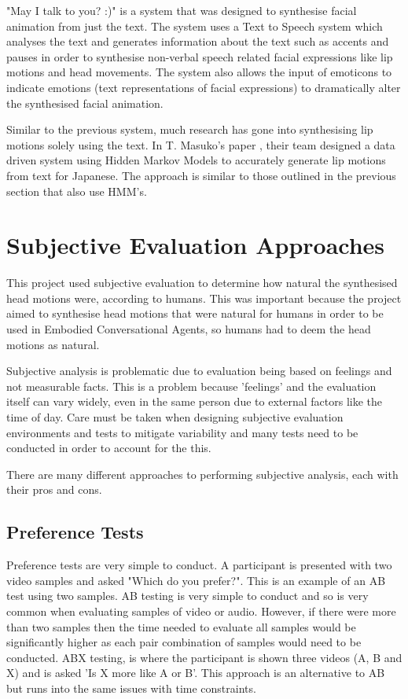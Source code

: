 \documentclass[bsc,frontabs,twoside,singlespacing,parskip]{infthesis}
\begin{document}
"May I talk to you? :)"  \cite{may_i_talk_to_you} is a system that was designed to synthesise facial animation from just the text. The system uses a Text to Speech system which analyses the text and generates information about the text such as accents and pauses in order to synthesise non-verbal speech related facial expressions like lip motions and head movements. The system also allows the input of emoticons to indicate emotions (text representations of facial expressions) to dramatically alter the synthesised facial animation. 

Similar to the previous system, much research has gone into synthesising lip motions solely using the text. In T. Masuko's paper  \cite{lip_motion}, their team designed a data driven system using Hidden Markov Models to accurately generate lip motions from text for Japanese. The approach is similar to those outlined in the previous section that also use HMM's.

\section{Subjective Evaluation Approaches}

This project used subjective evaluation to determine how natural the synthesised head motions were, according to humans. This was important because the project aimed to synthesise head motions that were natural for humans in order to be used in Embodied Conversational Agents, so humans had to deem the head motions as natural.

Subjective analysis is problematic due to evaluation being based on feelings and not measurable facts. This is a problem because 'feelings' and the evaluation itself can vary widely, even in the same person due to external factors like the time of day. Care must be taken when designing subjective evaluation environments and tests to mitigate variability and many tests need to be conducted in order to account for the this. 

There are many different approaches to performing subjective analysis, each with their pros and cons. 

\subsection{Preference Tests}

Preference tests are very simple to conduct. A participant is presented with two video samples and asked "Which do you prefer?". This is an example of an AB test using two samples. AB testing is very simple to conduct and so is very common when evaluating samples of video or audio. However, if there were more than two samples then the time needed to evaluate all samples would be significantly higher as each pair combination of samples would need to be conducted. ABX testing, \cite{abx_testing} is where the participant is shown three videos (A, B and X) and is asked 'Is X more like A or B'. This approach is an alternative to AB but runs into the same issues with time constraints.
\end{document}
